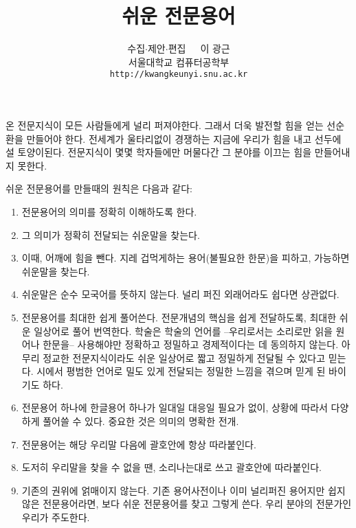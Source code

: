 \documentclass[11pt]{book}
\title{쉬운 전문용어}
\author{수집\(\cdot\)제안\(\cdot\)편집\ \ \  이 광근\\
  서울대학교 컴퓨터공학부\\
  \texttt{http://kwangkeunyi.snu.ac.kr}
}
\date{}
\begin{document}
\maketitle

온 전문지식이 모든 사람들에게 널리 퍼져야한다. 그래서 더욱 발전할 힘을 얻는
선순환을 만들어야 한다. 전세계가 울타리없이 경쟁하는 지금에 우리가
힘을 내고 선두에 설 토양이된다. 전문지식이 몇몇 학자들에만 머물다간 그 분야를
이끄는 힘을 만들어내지 못한다. 

쉬운 전문용어를 만들때의 원칙은 다음과 같다:
\begin{enumerate}
\item 전문용어의 의미를 정확히 이해하도록 한다.
\item 그 의미가 정확히 전달되는 쉬운말을 찾는다.
\item 이때, 어깨에 힘을 뺀다. 지레 겁먹게하는 용어(불필요한 한문)을 피하고, 가능하면
  쉬운말을 찾는다. 
\item 쉬운말은 순수 모국어를 뜻하지 않는다. 널리 퍼진 외래어라도 쉽다면 상관없다. 
\item 전문용어를 최대한 쉽게 풀어쓴다. 전문개념의 핵심을 쉽게
  전달하도록, 최대한 쉬운 일상어로 풀어 번역한다. 학술은 학술의 언어를
  --우리로서는 소리로만 읽을 원어나 한문을-- 사용해야만 정확하고
  정밀하고 경제적이다는 데 동의하지 않는다. 아무리 정교한 전문지식이라도 쉬운
  일상어로 짧고 정밀하게 전달될 수 있다고 믿는다. 시에서 평범한 언어로
  밀도 있게 전달되는 정밀한 느낌을 겪으며 믿게 된 바이기도 하다. 
\item 전문용어 하나에 한글용어 하나가 일대일 대응일 필요가 없이,
  상황에 따라서 다양하게 풀어쓸 수 있다. 중요한 것은 의미의 명확한
  전개.
\item 전문용어는 해당 우리말 다음에 괄호안에 항상 따라붙인다.
\item 도저히 우리말을 찾을 수 없을 땐, 소리나는대로 쓰고 괄호안에
  따라붙인다. 
\item 기존의 권위에 얽매이지 않는다. 기존 용어사전이나 이미 널리퍼진
  용어지만 쉽지않은 전문용어라면, 보다 쉬운 전문용어를 찾고 그렇게
  쓴다. 우리 분야의 전문가인 우리가 주도한다.

\end{enumerate}



\printindex
\end{document}
